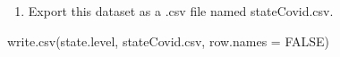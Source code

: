 \documentclass[
]{article}
\newenvironment{Shaded}{\begin{snugshade}}{\end{snugshade}}
\newcommand{\AttributeTok}[1]{\textcolor[rgb]{0.77,0.63,0.00}{#1}}
\newcommand{\ConstantTok}[1]{\textcolor[rgb]{0.00,0.00,0.00}{#1}}
\newcommand{\FunctionTok}[1]{\textcolor[rgb]{0.00,0.00,0.00}{#1}}
\newcommand{\NormalTok}[1]{#1}
\newcommand{\StringTok}[1]{\textcolor[rgb]{0.31,0.60,0.02}{#1}}
\providecommand{\tightlist}{%
  \setlength{\itemsep}{0pt}\setlength{\parskip}{0pt}}
\begin{document}
\begin{enumerate}
\def\labelenumi{\alph{enumi}.}
\setcounter{enumi}{6}
\tightlist
\item
  Export this dataset as a .csv file named stateCovid.csv.
\end{enumerate}

\begin{Shaded}
\begin{Highlighting}[]
\FunctionTok{write.csv}\NormalTok{(state.level, }\StringTok{\textquotesingle{}stateCovid.csv\textquotesingle{}}\NormalTok{, }\AttributeTok{row.names =} \ConstantTok{FALSE}\NormalTok{)}
\end{Highlighting}
\end{Shaded}
\end{document}
